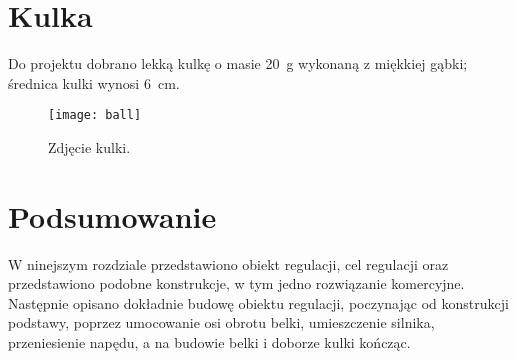 \section{Kulka}

Do projektu dobrano lekką kulkę o masie \SI{20}{g} wykonaną z miękkiej gąbki; średnica kulki wynosi \SI{6}{cm}.

\begin{figure}[H]
    \centering
    \texttt{[image: ball]}
    \caption{Zdjęcie kulki.}
    \label{fig:kulka}
\end{figure}

\section{Podsumowanie}

W ninejszym rozdziale przedstawiono obiekt regulacji, cel regulacji oraz przedstawiono podobne konstrukcje, w tym jedno rozwiązanie komercyjne. Następnie opisano dokładnie budowę obiektu regulacji, poczynając od konstrukcji podstawy, poprzez umocowanie osi obrotu belki, umieszczenie silnika, przeniesienie napędu, a na budowie belki i doborze kulki kończąc.

